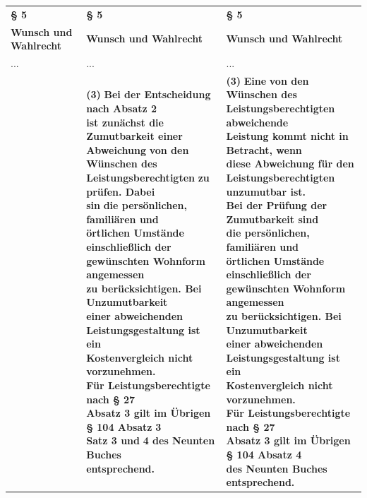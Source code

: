 \documentclass[10pt,a4paper,landscape]{article}
\begin{document}
\begin{longtable}{|L{8.2cm}|L{8.2cm}|L{8.2cm}|}
\hhline{|---|}
\textbf{\S{} 5} & \textbf{\S{} 5} & \textbf{\S{} 5} \\
\hhline{|---|}
\textbf{Wunsch und Wahlrecht} & \textbf{Wunsch und Wahlrecht} & \textbf{Wunsch und Wahlrecht} \\
\hhline{|---|}
... & ... & ... \\
\hhline{|---|}
 & \textbf{(3) }\textbf{\textcolor{diffred}{Bei der Entscheidung nach Absatz 2  \newline ist zunächst die Zumutbarkeit einer  \newline Abweichung}}\textbf{ von den Wünschen des  \newline Leistungsberechtigten }\textbf{\textcolor{diffred}{zu prüfen. Dabei  \newline sin}}\textbf{ die persönlichen, familiären und  \newline örtlichen Umstände einschließlich der  \newline gewünschten Wohnform angemessen  \newline zu berücksichtigen. Bei Unzumutbarkeit  \newline einer abweichenden  \newline Leistungsgestaltung ist ein  \newline Kostenvergleich nicht vorzunehmen.  \newline Für Leistungsberechtigte nach \S{} 27  \newline Absatz 3 gilt im Übrigen \S{} 104 Absatz }\textbf{\textcolor{diffred}{3  \newline Satz 3 und}}\textbf{ 4 des Neunten Buches  \newline entsprechend. } & \textbf{(3) }\textbf{\textcolor{diffgreen}{Eine}}\textbf{ von den Wünschen des  \newline Leistungsberechtigten }\textbf{\textcolor{diffgreen}{abweichende  \newline Leistung kommt nicht in Betracht, wenn  \newline diese Abweichung für den  \newline Leistungsberechtigten unzumutbar ist.  \newline Bei der Prüfung der Zumutbarkeit sind}}\textbf{  \newline die persönlichen, familiären und  \newline örtlichen Umstände einschließlich der  \newline gewünschten Wohnform angemessen  \newline zu berücksichtigen. Bei Unzumutbarkeit  \newline einer abweichenden  \newline Leistungsgestaltung ist ein  \newline Kostenvergleich nicht vorzunehmen.  \newline Für Leistungsberechtigte nach \S{} 27  \newline Absatz 3 gilt im Übrigen \S{} 104 Absatz 4  \newline des Neunten Buches entsprechend. } \\

\end{longtable}
\end{document}
